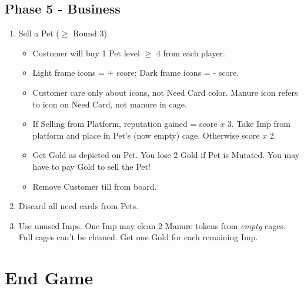 \documentclass[12pt]{article}
\newenvironment{enumerateCustom}
{\begin{enumerate}
  \setlength{\itemsep}{1pt}
  \setlength{\parskip}{0pt}
  \setlength{\parsep}{0pt}}
{\end{enumerate}}
\newenvironment{itemizeCustom}
{\begin{itemize}
  \setlength{\itemsep}{1pt}
  \setlength{\parskip}{0pt}
  \setlength{\parsep}{0pt}}
{\end{itemize}}
\begin{document}
\begin{multicols*}{2}
\subsection*{Phase 5 - Business}
\begin{enumerateCustom}
	\item Sell a Pet ($\ge$ Round 3)
		\begin{itemizeCustom}
			\item Customer will buy 1 Pet level $\ge$ 4 from each player.
			\item Light frame icons = + score; Dark frame icons = - score.
			\item Customer care only about icons, not Need Card color. Manure icon refers to icon on Need Card, not manure in cage.
			\item If Selling from Platform, reputation gained = score $x$ 3. Take Imp from platform and place in Pet's (now empty) cage. Otherwise score $x$ 2.
			\item Get Gold as depicted on Pet. You lose 2 Gold if Pet is Mutated. You may have to pay Gold to sell the Pet!
			\item Remove Customer till from board.
		\end{itemizeCustom}
	\item Discard all need cards from Pets.
	\item Use unused Imps. One Imp may clean 2 Manure tokens from \emph{empty} cages. Full cages can't be cleaned. Get one Gold for each remaining Imp.
\end{enumerateCustom}

\section*{End Game}

\end{multicols*}
\end{document}
